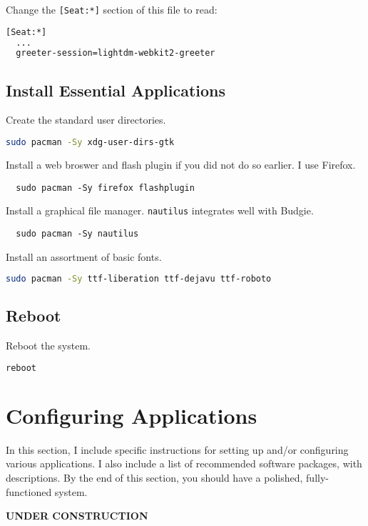 \documentclass[letterpaper,12pt]{article}
\newcommand{\p}{\par\bigskip}
\begin{document}
Change the {\tt [Seat:*]} section of this file to read:
\begin{lstlisting}[language=bash]
  [Seat:*]
  ...
  greeter-session=lightdm-webkit2-greeter
\end{lstlisting}


\subsection{Install Essential Applications}
Create the standard user directories.
\begin{lstlisting}[language=bash]
  sudo pacman -Sy xdg-user-dirs-gtk
\end{lstlisting} \p

Install a web broswer and flash plugin if you did not do so earlier. I use Firefox.
\begin{lstlisting}
  sudo pacman -Sy firefox flashplugin
\end{lstlisting} \p

Install a graphical file manager. {\tt nautilus} integrates well with Budgie.
\begin{lstlisting}
  sudo pacman -Sy nautilus
\end{lstlisting}

Install an assortment of basic fonts.
\begin{lstlisting}[language=bash]
  sudo pacman -Sy ttf-liberation ttf-dejavu ttf-roboto
\end{lstlisting}


\subsection{Reboot}
Reboot the system.
\begin{lstlisting}[language=bash]
  reboot
\end{lstlisting}


\section{Configuring Applications}

In this section, I include specific instructions for setting up and/or configuring various applications. I also include a list of recommended software packages, with descriptions. By the end of this section, you should have a polished, fully-functioned system. \p

{\bf UNDER CONSTRUCTION}
\end{document}
